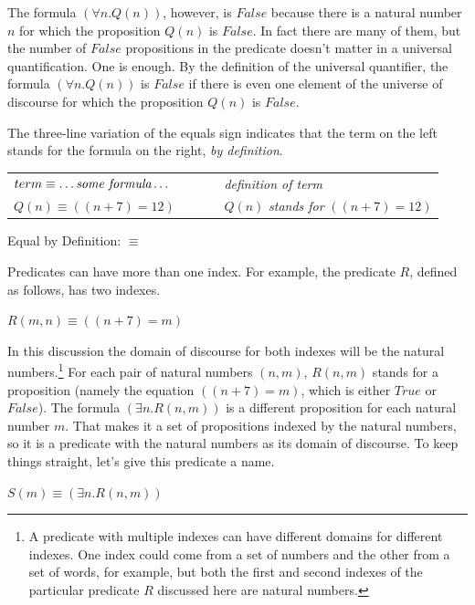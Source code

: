 {{The formula $(\forall n.Q(n))$, however, is $False$
because there is a natural number $n$ for which
the proposition $Q(n)$ is $False$.
In fact there are many of them, but
the number of $False$ propositions in the predicate doesn't matter
in a universal quantification. One is enough.
By the definition of the universal quantifier,
the formula $(\forall n.Q(n))$
is $False$ if there is even one element of the
universe of discourse for which the proposition
$Q(n)$ is $False$.

\begin{aside}
The three-line variation of the equals sign
indicates that the term on the left stands
for the formula on the right, \emph{by definition}.
\begin{center}
\begin{tabular}{ll}
$term \equiv \dots \emph{some formula} \dots$ & ~~~~~ \emph{definition of term} \\
$Q(n) \equiv ((n + 7) = 12)$                  & ~~~~~ $Q(n)$ \emph{stands for} $((n + 7) = 12)$ \\
\end{tabular}
\end{center}
\caption{Equal by Definition: $\equiv$}
\label{aside:ch02-three-line-equal}
\end{aside}

Predicates can have more than one index.
For example, the predicate $R$,
defined as follows, has two indexes.
\begin{center}
$R(m, n) \equiv ((n + 7) = m)$
\end{center}
In this discussion the domain of discourse
for both indexes will be the natural numbers.\footnote{A
predicate with multiple indexes can
have different domains for different indexes.
One index could come from a set of numbers
and the other from a set of words, for example,
but both the first and second indexes
of the particular predicate $R$ discussed here
are natural numbers.}
For each pair of natural numbers $(n, m)$,
$R(n, m)$ stands for a proposition (namely the
equation $((n + 7) = m)$, which is either $True$ or $False$).
The formula $(\exists n.R(n,m))$ is a different
proposition for each natural number $m$.
That makes it a set of propositions indexed by the natural numbers,
so it is a predicate with the natural numbers as its domain of discourse.
To keep things straight, let's give this predicate a name.
\begin{center}
$S(m) \equiv (\exists n.R(n,m))$
\end{center}

}}
